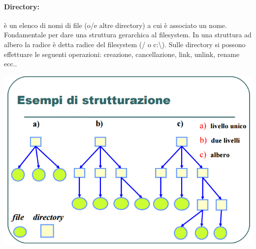 \documentclass[a4paper]{report}
\begin{document}
\paragraph{Directory:} è un elenco di nomi di file (o/e altre directory) a cui
è associato un nome. Fondamentale per dare una struttura gerarchica al
filesystem. In una struttura ad albero la radice è detta radice
del filesystem (/ o c:\textbackslash). Sulle directory si possono effettuare le seguenti
operazioni: creazione, cancellazione, link, unlink,
rename ecc..
\begin{center}
\includegraphics[scale=0.5]{strutturadir.png}
\end{center}
\end{document}
